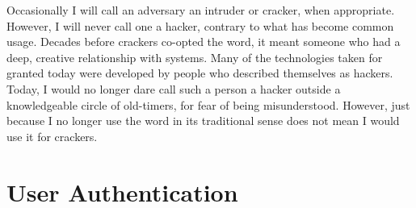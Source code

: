 Occasionally I will call an adversary an intruder or cracker, when
appropriate.  However, I will never call one a hacker, contrary
to what has become common usage.  Decades before crackers co-opted the
word, it meant someone who had a deep, creative relationship with
systems.  Many of the technologies taken for granted today were
developed by people who described themselves as hackers.  Today, I
would no longer dare call such a person a hacker outside a
knowledgeable circle of old-timers, for fear of being misunderstood.
However, just because I no longer use the word in
its traditional sense does not mean I would use it for
crackers.

\section{User Authentication}\label{user-authentication-section}

